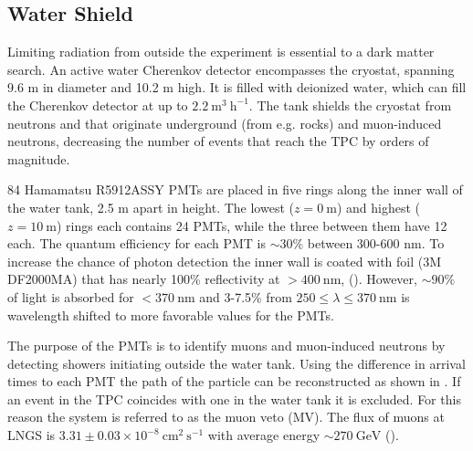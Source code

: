\subsection{Water Shield}
\label{subsec:xenon1t_water_shield}
Limiting radiation from outside the experiment is essential to a dark matter search.  An active water Cherenkov detector encompasses the
cryostat, spanning 9.6 m in diameter and 10.2 m high.  It is filled with deionized water, which can fill the Cherenkov detector at up to
$2.2\ \mathrm{m^{3}\ h^{-1}}$.  The tank shields the cryostat from neutrons and \gammarays that originate underground (from e.g. rocks)
and muon-induced neutrons, decreasing the number of events that reach the TPC by orders of magnitude.

84 Hamamatsu R5912ASSY PMTs are placed in five rings along the inner wall of the water tank, 2.5 m apart in height.  The lowest
($z = 0\ \mathrm{m}$) and highest ($z = 10\ \mathrm{m}$) rings each contains 24 PMTs, while the three between them have 12 each.  The
quantum efficiency for each PMT is ${\sim}30\%$ between 300-600 nm.  To increase the chance of photon detection the inner wall is coated
with foil (3M DF2000MA) that has
nearly 100\% reflectivity at $> 400\ \mathrm{nm}$, ().  However, ${\sim}90\%$ of light is absorbed for
$<370\ \mathrm{nm}$ and 3-7.5\% from $250 \leq \lambda \leq 370\ \mathrm{nm}$ is wavelength shifted to more favorable values for the PMTs.

The purpose of the PMTs is to identify muons and muon-induced neutrons by detecting showers initiating
outside the water tank.  Using the difference in arrival times to each PMT the path of the particle can be reconstructed as shown in
.  If an event in the TPC coincides with one in the water tank it is excluded.  For this reason
the system is referred to as the muon veto (MV).  The flux of muons at LNGS is $3.31 \pm 0.03 \times 10^{-8}\ \mathrm{cm^2\ s^{-1}}$ with
average energy ${\sim}270\ \mathrm{GeV}$ ().

